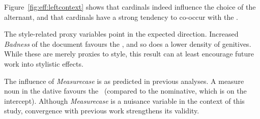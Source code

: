 Figure~\ref{fig:eff:leftcontext} shows that cardinals indeed influence the choice of the alternant, and that cardinals have a strong tendency to co-occur with the \NACa.

The style-related proxy variables point in the expected direction.
Increased \textit{Badness} of the document favours the \NACa, and so does a lower density of genitives.
While these are merely proxies to style, this result can at least encourage future work into stylistic effects. 

The influence of \textit{Measurecase} is as predicted in previous analyses.
A measure noun in the dative favours the \PGCa\ (compared to the nominative, which is on the intercept).
Although \textit{Measurecase} is a nuisance variable in the context of this study, convergence with previous work strengthens its validity.

